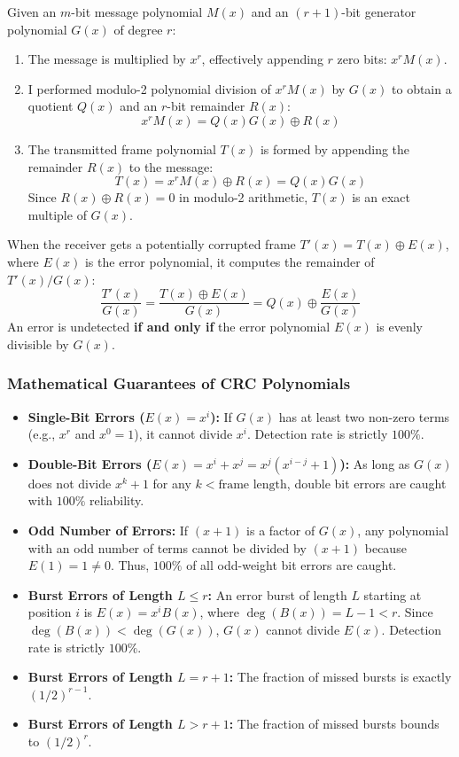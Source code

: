 \documentclass[12pt,a4paper]{article}
\begin{document}
Given an $m$-bit message polynomial $M(x)$ and an $(r+1)$-bit generator polynomial $G(x)$ of degree $r$:
\begin{enumerate}[leftmargin=*]
    \item The message is multiplied by $x^r$, effectively appending $r$ zero bits: $x^r M(x)$.
    \item I performed modulo-2 polynomial division of $x^r M(x)$ by $G(x)$ to obtain a quotient $Q(x)$ and an $r$-bit remainder $R(x)$:
    \begin{equation}
        x^r M(x) = Q(x) G(x) \oplus R(x)
    \end{equation}
    \item The transmitted frame polynomial $T(x)$ is formed by appending the remainder $R(x)$ to the message:
    \begin{equation}
        T(x) = x^r M(x) \oplus R(x) = Q(x) G(x)
    \end{equation}
    Since $R(x) \oplus R(x) = 0$ in modulo-2 arithmetic, $T(x)$ is an exact multiple of $G(x)$.
\end{enumerate}

When the receiver gets a potentially corrupted frame $T'(x) = T(x) \oplus E(x)$, where $E(x)$ is the error polynomial, it computes the remainder of $T'(x) / G(x)$:
\begin{equation}
    \frac{T'(x)}{G(x)} = \frac{T(x) \oplus E(x)}{G(x)} = Q(x) \oplus \frac{E(x)}{G(x)}
\end{equation}
An error is undetected \textbf{if and only if} the error polynomial $E(x)$ is evenly divisible by $G(x)$.

\subsubsection{Mathematical Guarantees of CRC Polynomials}
\begin{itemize}[leftmargin=*]
    \item \textbf{Single-Bit Errors ($E(x) = x^i$):} If $G(x)$ has at least two non-zero terms (e.g., $x^r$ and $x^0 = 1$), it cannot divide $x^i$. Detection rate is strictly $100\%$.
    \item \textbf{Double-Bit Errors ($E(x) = x^i + x^j = x^j(x^{i-j} + 1)$):} As long as $G(x)$ does not divide $x^k + 1$ for any $k < \text{frame length}$, double bit errors are caught with $100\%$ reliability.
    \item \textbf{Odd Number of Errors:} If $(x+1)$ is a factor of $G(x)$, any polynomial with an odd number of terms cannot be divided by $(x+1)$ because $E(1) = 1 \neq 0$. Thus, $100\%$ of all odd-weight bit errors are caught.
    \item \textbf{Burst Errors of Length $L \le r$:} An error burst of length $L$ starting at position $i$ is $E(x) = x^i B(x)$, where $\deg(B(x)) = L - 1 < r$. Since $\deg(B(x)) < \deg(G(x))$, $G(x)$ cannot divide $E(x)$. Detection rate is strictly $100\%$.
    \item \textbf{Burst Errors of Length $L = r + 1$:} The fraction of missed bursts is exactly $(1/2)^{r-1}$.
    \item \textbf{Burst Errors of Length $L > r + 1$:} The fraction of missed bursts bounds to $(1/2)^r$.
\end{itemize}
\end{document}
